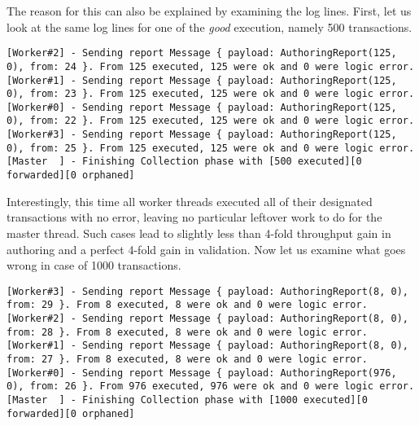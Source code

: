 \begin{itemize}
	The reason for this can also be explained by examining the log lines. First, let us look at the
	same log lines for one of the \textit{good} execution, namely 500 transactions.

	\begin{lstlisting}
[Worker#2] - Sending report Message { payload: AuthoringReport(125, 0), from: 24 }. From 125 executed, 125 were ok and 0 were logic error.
[Worker#1] - Sending report Message { payload: AuthoringReport(125, 0), from: 23 }. From 125 executed, 125 were ok and 0 were logic error.
[Worker#0] - Sending report Message { payload: AuthoringReport(125, 0), from: 22 }. From 125 executed, 125 were ok and 0 were logic error.
[Worker#3] - Sending report Message { payload: AuthoringReport(125, 0), from: 25 }. From 125 executed, 125 were ok and 0 were logic error.
[Master  ] - Finishing Collection phase with [500 executed][0 forwarded][0 orphaned]
	\end{lstlisting}

	Interestingly, this time all worker threads executed all of their designated transactions with
	no error, leaving no particular leftover work to do for the master thread. Such cases lead to
	slightly less than 4-fold throughput gain in authoring and a perfect 4-fold gain in validation.
	Now let us examine what goes wrong in case of 1000 transactions.

	\begin{lstlisting}
[Worker#3] - Sending report Message { payload: AuthoringReport(8, 0), from: 29 }. From 8 executed, 8 were ok and 0 were logic error.
[Worker#2] - Sending report Message { payload: AuthoringReport(8, 0), from: 28 }. From 8 executed, 8 were ok and 0 were logic error.
[Worker#1] - Sending report Message { payload: AuthoringReport(8, 0), from: 27 }. From 8 executed, 8 were ok and 0 were logic error.
[Worker#0] - Sending report Message { payload: AuthoringReport(976, 0), from: 26 }. From 976 executed, 976 were ok and 0 were logic error.
[Master  ] - Finishing Collection phase with [1000 executed][0 forwarded][0 orphaned]
	\end{lstlisting}


\end{itemize}
